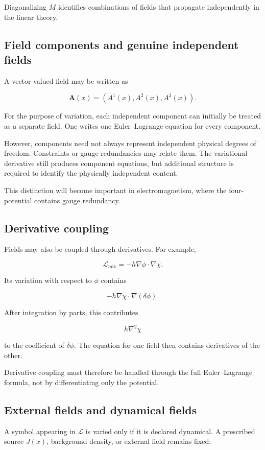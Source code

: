 Diagonalizing \(M\) identifies combinations of fields that propagate independently in the linear theory.

\subsection{Field components and genuine independent fields}

A vector-valued field may be written as

\[
\mathbf{A}(x)
=
(A^{1}(x),A^{2}(x),A^{3}(x)).
\]

For the purpose of variation, each independent component can initially be treated as a separate field. One writes one Euler--Lagrange equation for every component.

However, components need not always represent independent physical degrees of freedom. Constraints or gauge redundancies may relate them. The variational derivative still produces component equations, but additional structure is required to identify the physically independent content.

This distinction will become important in electromagnetism, where the four-potential contains gauge redundancy.

\subsection{Derivative coupling}

Fields may also be coupled through derivatives. For example,

\[
\mathcal{L}_{\mathrm{mix}}
=
-h\nabla\phi\cdot\nabla\chi.
\]

Its variation with respect to \(\phi\) contains

\[
-h\nabla\chi\cdot\nabla(\delta\phi).
\]

After integration by parts, this contributes

\[
h\nabla^{2}\chi
\]

to the coefficient of \(\delta\phi\). The equation for one field then contains derivatives of the other.

Derivative coupling must therefore be handled through the full Euler--Lagrange formula, not by differentiating only the potential.

\subsection{External fields and dynamical fields}

A symbol appearing in \(\mathcal{L}\) is varied only if it is declared dynamical. A prescribed source \(J(x)\), background density, or external field remains fixed:

